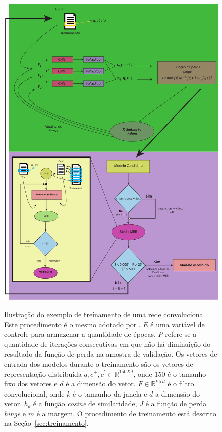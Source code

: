 \begin{figure}[p]
\centering
\caption[Ilustração do exemplo de treinamento de uma rede convolucional.]{Ilustração do exemplo de treinamento de uma rede convolucional. Este procedimento é o mesmo adotado por . $E$ é uma variável de controle para armazenar a quantidade de épocas. $P$ refere-se a quantidade de iterações consecutivas em que não há diminuição do resultado da função de perda na amostra de validação. Os vetores de entrada dos modelos durante o treinamento são os vetores de representação distribuída $q, c^{+}, c^{'} \in \mathbb{R}^{150 X d}$, onde $150$ é o tamanho fixo dos vetores e $d$ é a dimensão do vetor. $F \in \mathbb{R}^{k X d}$ é o filtro convolucional, onde $k$ é o tamanho da janela e $d$ a dimensão do vetor. $h_{\theta}$ é a função \textit{cosine} de similaridade, $J$ é a função de perda \textit{hinge} e $m$ é a margem. O procedimento de treinamento está descrito na Seção~\ref{sec:treinamento}.}
\includegraphics[height=1.3\textwidth]{figuras/cap-experimento/evaluation_process.pdf}
\label{fig:evaluation-process}
\end{figure}

